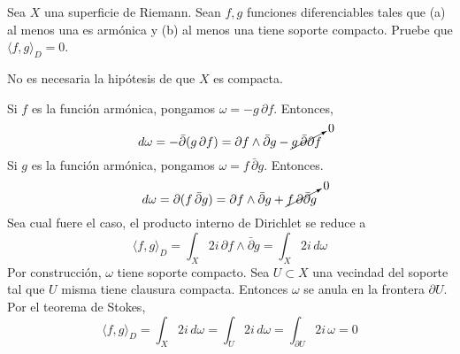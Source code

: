 \begin{exercise}
Sea $X$ una superficie de Riemann. Sean $f, g$ funciones diferenciables tales que (a) al menos una es armónica y (b) al menos una tiene soporte compacto. Pruebe que $\langle f, g \rangle_D = 0$.
\end{exercise}

\begin{remark}
No es necesaria la hipótesis de que $X$ es compacta.
\end{remark}

\begin{solution}
Si $f$ es la función armónica, pongamos $\omega = -g \, \partial f$. Entonces,
$$
d\omega
    = -\bar \partial (g \, \partial f)
    = \partial f \wedge \bar \partial g - \cancelto 0 {g \, \bar \partial \partial f}
$$
Si $g$ es la función armónica, pongamos $\omega = f \, \bar \partial g$. Entonces.
$$
d\omega
    = \partial (f \, \bar \partial g)
    = \partial f \wedge \bar \partial g + \cancelto 0 {f \, \partial \bar \partial g}
$$
Sea cual fuere el caso, el producto interno de Dirichlet se reduce a
$$\langle f, g \rangle_D = \int_X 2i \, \partial f \wedge \bar \partial g = \int_X 2i \, d\omega$$
Por construcción, $\omega$ tiene soporte compacto. Sea $U \subset X$ una vecindad del soporte tal que $U$ misma tiene clausura compacta. Entonces $\omega$ se anula en la frontera $\partial U$. Por el teorema de Stokes,
$$\langle f, g \rangle_D = \int_X 2i \, d\omega = \int_U 2i \, d\omega = \int_{\partial U} 2i \, \omega = 0$$
\end{solution}
